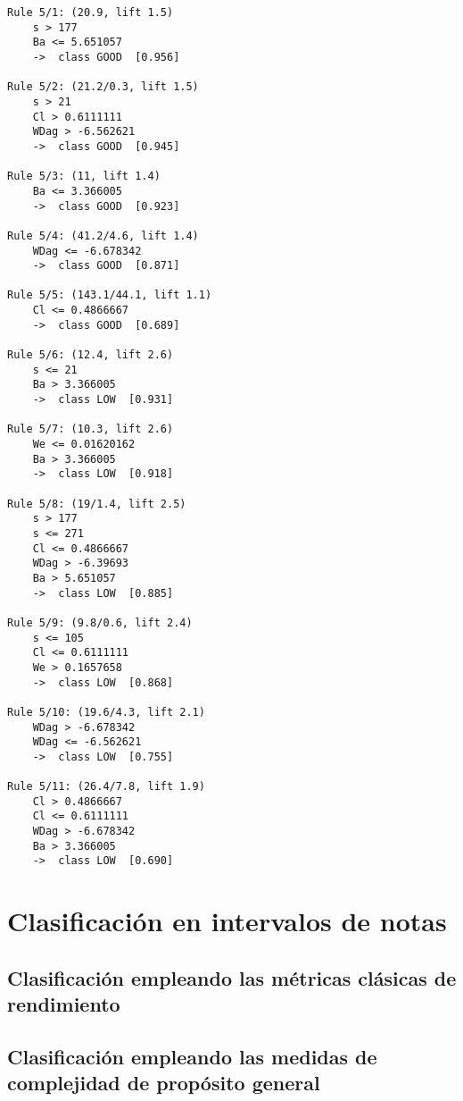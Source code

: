 \begin{tcolorbox}[title=Reglas de clasificación para identificar grupos de tipo \emph{``LOW''}.]
  \makeatletter
  \makeatother
\begin{multicols}{2}
    \begin{verbatim}
Rule 5/1: (20.9, lift 1.5)
	s > 177
	Ba <= 5.651057
	->  class GOOD  [0.956]

Rule 5/2: (21.2/0.3, lift 1.5)
	s > 21
	Cl > 0.6111111
	WDag > -6.562621
	->  class GOOD  [0.945]

Rule 5/3: (11, lift 1.4)
	Ba <= 3.366005
	->  class GOOD  [0.923]

Rule 5/4: (41.2/4.6, lift 1.4)
	WDag <= -6.678342
	->  class GOOD  [0.871]

Rule 5/5: (143.1/44.1, lift 1.1)
	Cl <= 0.4866667
	->  class GOOD  [0.689]

Rule 5/6: (12.4, lift 2.6)
	s <= 21
	Ba > 3.366005
	->  class LOW  [0.931]

Rule 5/7: (10.3, lift 2.6)
	We <= 0.01620162
	Ba > 3.366005
	->  class LOW  [0.918]

Rule 5/8: (19/1.4, lift 2.5)
	s > 177
	s <= 271
	Cl <= 0.4866667
	WDag > -6.39693
	Ba > 5.651057
	->  class LOW  [0.885]

Rule 5/9: (9.8/0.6, lift 2.4)
	s <= 105
	Cl <= 0.6111111
	We > 0.1657658
	->  class LOW  [0.868]

Rule 5/10: (19.6/4.3, lift 2.1)
	WDag > -6.678342
	WDag <= -6.562621
	->  class LOW  [0.755]

Rule 5/11: (26.4/7.8, lift 1.9)
	Cl > 0.4866667
	Cl <= 0.6111111
	WDag > -6.678342
	Ba > 3.366005
	->  class LOW  [0.690]
    \end{verbatim}
  \end{multicols}
\label{rules1}
\end{tcolorbox}

\section{Clasificación en intervalos de notas}\label{sec:intervals}

\subsection{Clasificación empleando las métricas clásicas de rendimiento}

\subsection{Clasificación empleando las medidas de complejidad de propósito general}

